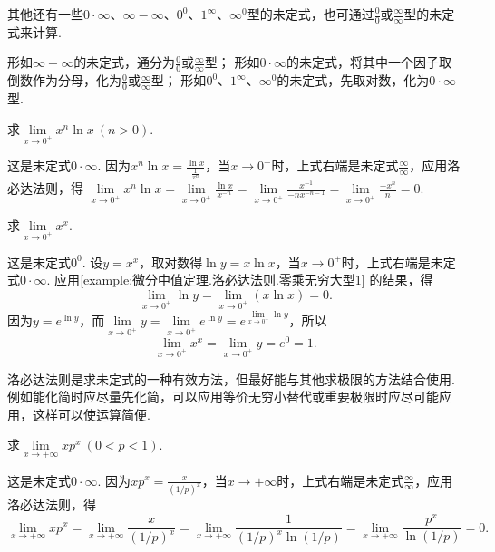 其他还有一些\(0 \cdot \infty\)、\(\infty - \infty\)、\(0^0\)、\(1^\infty\)、\(\infty^0\)型的未定式，也可通过\(\frac{0}{0}\)或\(\frac{\infty}{\infty}\)型的未定式来计算.

形如\(\infty - \infty\)的未定式，通分为\(\frac{0}{0}\)或\(\frac{\infty}{\infty}\)型；
形如\(0 \cdot \infty\)的未定式，将其中一个因子取倒数作为分母，化为\(\frac{0}{0}\)或\(\frac{\infty}{\infty}\)型；
形如\(0^0\)、\(1^\infty\)、\(\infty^0\)的未定式，先取对数，化为\(0 \cdot \infty\)型.

\begin{example}\label{example:微分中值定理.洛必达法则.零乘无穷大型1}
\def\l{\lim\limits_{x\to0^+}}%
求\(\l x^n \ln x\ (n > 0)\).
\begin{solution}
这是未定式\(0\cdot\infty\).
因为\(x^n \ln x = \frac{\ln x}{\frac{1}{x^n}}\)，当\(x\to0^+\)时，上式右端是未定式\(\frac{\infty}{\infty}\)，应用洛必达法则，得%
\(\l x^n \ln x
= \l \frac{\ln x}{x^{-n}}
= \l \frac{x^{-1}}{-nx^{-n-1}}
= \l \frac{-x^n}{n}
= 0\).
\end{solution}
\end{example}

\begin{example}\label{example:微分中值定理.洛必达法则.零次方零型1}
\def\l{\lim\limits_{x\to0^+}}%
求\(\lim\limits_{x\to0^+}{x^x}\).
\begin{solution}
这是未定式\(0^0\).
设\(y = x^x\)，取对数得\(\ln y = x \ln x\)，当\(x\to0^+\)时，上式右端是未定式\(0\cdot\infty\).
应用\cref{example:微分中值定理.洛必达法则.零乘无穷大型1} 的结果，得\[
\l \ln y = \l (x \ln x) = 0.
\]
因为\(y = e^{\ln y}\)，而\(\l y = \l e^{\ln y} = e^{\l \ln y}\)，所以\[
\l x^x = \l y = e^0 = 1.
\]
\end{solution}
\end{example}

洛必达法则是求未定式的一种有效方法，但最好能与其他求极限的方法结合使用.
例如能化简时应尽量先化简，可以应用等价无穷小替代或重要极限时应尽可能应用，这样可以使运算简便.

\begin{example}\label{example:微分中值定理.洛必达法则.零乘无穷大型2}
\def\l{\lim\limits_{x\to+\infty}}%
求\(\l x p^x\ (0<p<1)\).
\begin{solution}
这是未定式\(0\cdot\infty\).
因为\(x p^x =  \frac{x}{(1/p)^x}\)，当\(x\to+\infty\)时，上式右端是未定式\(\frac{\infty}{\infty}\)，应用洛必达法则，得\[
\l x p^x
= \l \frac{x}{(1/p)^x}
= \l \frac{1}{(1/p)^x \ln(1/p)}
= \l \frac{p^x}{\ln(1/p)}
= 0.
\]
\end{solution}
\end{example}

